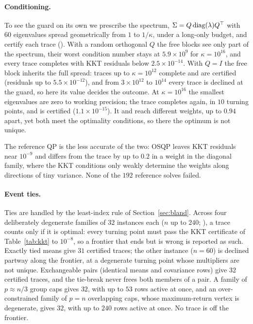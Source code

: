 \paragraph{Conditioning.}
To see the guard on its own we prescribe the spectrum,
$\Sigma = Q \operatorname{diag}(\lambda) Q^\top$ with $60$ eigenvalues spread geometrically
from $1$ to $1/\kappa$, under a long-only budget, and certify each trace
(). With a random orthogonal
$Q$ the free blocks see only part of the spectrum, their worst condition number stays at
$5.9\times10^{9}$ for $\kappa = 10^{16}$, and every trace completes with KKT residuals
below $2.5\times10^{-14}$. With $Q = I$ the free block inherits the full spread: traces
up to $\kappa = 10^{12}$ complete and are certified (residuals up to
$5.5\times10^{-12}$), and from $3\times10^{12}$ to $10^{14}$ every trace is declined at
the guard, so here its value decides the outcome. At $\kappa = 10^{16}$ the smallest
eigenvalues are zero to working precision; the trace completes again, in $10$ turning
points, and is certified ($1.1\times10^{-15}$). It and  reach different weights,
up to $0.94$ apart, yet both meet the optimality conditions, so there the optimum is not
unique.

The reference QP is the less accurate of the two: OSQP leaves KKT residuals near
$10^{-9}$ and differs from the trace by up to $0.2$ in a weight in the diagonal family,
where the KKT conditions only weakly determine the weights along directions of tiny
variance. None of the $192$ reference solves failed.

\paragraph{Event ties.}
Ties are handled by the least-index rule of Section~\ref{sec:bland}. Across four deliberately
degenerate families of $32$ instances each ($n$ up to $240$; ),
a trace counts only if it is optimal: every turning point must pass the KKT certificate
of Table~\ref{tab:kkt} to $10^{-8}$, so a frontier that ends but is wrong is reported
as such. Exactly tied means give $31$ certified traces; the other instance ($n=60$) is
declined partway along the frontier, at a degenerate turning point whose multipliers are
not unique. Exchangeable pairs (identical means and covariance rows) give $32$ certified
traces, and the tie-break never frees both members of a pair. A family of
$p\approx n/3$ group caps gives $32$, with up to $53$ rows active at once, and an
over-constrained family of $p=n$ overlapping caps, whose maximum-return vertex is
degenerate, gives $32$, with up to $240$ rows active at once. No trace is off the
frontier.

